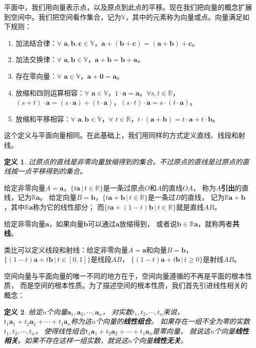 \documentclass[12pt,UTF8]{ctexbook}
\newtheorem{df}{定义}[section]
\begin{document}
平面中，我们用向量表示点，以及原点到此点的平移。现在我们把向量的概念扩展到空间中。我们把空间看作集合，记为$\mathbb{V}$，其中的元素称为向量或点。向量满足如下规则：

\begin{enumerate}
    \item 加法结合律：$\forall \,\, \mathbf{a}, \mathbf{b}, \mathbf{c} \in \mathbb{V}$，$\mathbf{a}+ (\mathbf{b} + \mathbf{c}) = (\mathbf{a} + \mathbf{b}) + \mathbf{c}$。
    \item 加法交换律：$\forall \,\, \mathbf{a}, \mathbf{b} \in \mathbb{V}$，$\mathbf{a} + \mathbf{b} = \mathbf{b} + \mathbf{a}$。
    \item 存在零向量：$\forall \,\, \mathbf{a} \in \mathbb{V}$，$\mathbf{a} + \mathbf{0} = \mathbf{a}$。
    \item 放缩和四则运算相容：$\forall \,\, \mathbf{a} \in \mathbb{V}$，$1\cdot \mathbf{a} = \mathbf{a}$。$\forall s, t \in \mathbb{R}$，$(s + t)\cdot\mathbf{a} = (s\cdot\mathbf{a}) + (t\cdot\mathbf{a})$，$(s \cdot t)\cdot \mathbf{a} = s \cdot (t\cdot \mathbf{a})$。
    \item 放缩和平移相容：$\forall \,\, \mathbf{a}, \mathbf{b} \in \mathbb{V}$，$\forall \,\, t \in \mathbb{R}$，$t\cdot(\mathbf{a} + \mathbf{b}) = t\cdot\mathbf{a} + t\cdot\mathbf{b}$。
\end{enumerate}

这个定义与平面向量相同。在此基础上，我们用同样的方式定义直线、线段和射线。
\begin{df}
    过原点的直线是非零向量放缩得到的集合。不过原点的直线是过原点的直线按一点平移得到的集合。
\end{df}
给定非零向量$A = \mathbf{a}$，$ \{t\mathbf{a} \, | \, t\in\mathbb{R}\}$是一条过原点$O$和$A$的直线$OA$，
称为$A$\textbf{引出}的直线，记为$\mathbb{R}\mathbf{a}$。
给定向量$B = \mathbf{b}$，$ \{t\mathbf{a}+\mathbf{b} \, | \, t\in\mathbb{R}\}$是一条过$B$的直线，
记为$\mathbb{R}\mathbf{a}+\mathbf{b}$，其中$\mathbb{R}\mathbf{a}$称为它的线性部分；
而$ \{t\mathbf{a}+(1 - t)\mathbf{b} \, | \, t\in\mathbb{R}\}$就是直线$AB$。

给定非零向量$\mathbf{a}$，如果向量$\mathbf{b}$可以通过$\mathbf{a}$放缩得到，
或者说$\mathbf{b}\in \mathbb{R}\mathbf{a}$，就称两者\textbf{共线}。

类比可以定义线段和射线：给定非零向量$A = \mathbf{a}$和向量$B =\mathbf{b}$，
$ \{(1 - t)\mathbf{a}+t\mathbf{b} \, | \, t\in [0, 1]\}$是线段$AB$，
$ \{(1 - t)\mathbf{a}+t\mathbf{b} \, | \, t \geqslant 0 \}$是射线$AB$。

空间向量与平面向量的唯一不同的地方在于，空间向量遵循的不再是平面的根本性质，
而是空间的根本性质。为了描述空间的根本性质，我们首先引进线性相关的概念：
\begin{df}
    给定$n$个向量$\mathbf{a}_1, \mathbf{a}_2, \cdots , \mathbf{a}_n$，
    对实数$t_1, t_2, \cdots , t_n$来说，
    $t_1\mathbf{a}_1 + t_2\mathbf{a}_2 + \cdots + t_1\mathbf{a}_n$称为这$n$个向量的\textbf{线性组合}。
    如果存在一组不全为零的实数$t_1, t_2, \cdots , t_n$，
    使得线性组合$t_1\mathbf{a}_1 + t_2\mathbf{a}_2 + \cdots + t_1\mathbf{a}_n$是零向量，
    就说这$n$个向量\textbf{线性相关}。如果不存在这样一组实数，就说这$n$个向量\textbf{线性无关}。
\end{df}
\end{document}
